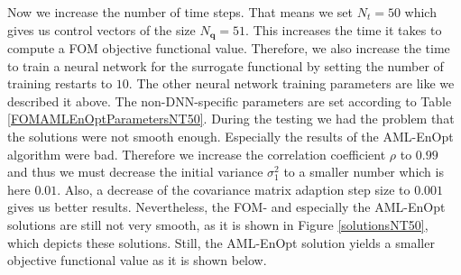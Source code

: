Now we increase the number of time steps. That means we set $N_t=50$ which gives us control vectors of the size $N_\mathbf{q}=51$. This increases the time it takes to compute a FOM objective functional value. Therefore, we also increase the time to train a neural network for the surrogate functional by setting the number of training restarts to $10$. The other neural network training parameters are like we described it above. The non-DNN-specific parameters are set according to Table \ref{FOMAMLEnOptParametersNT50}. During the testing we had the problem that the solutions were not smooth enough. Especially the results of the AML-EnOpt algorithm were bad. Therefore we increase the correlation coefficient $\rho$ to $0.99$ and thus we must decrease the initial variance $\sigma^2_1$ to a smaller number which is here $0.01$. Also, a decrease of the covariance matrix adaption step size to $0.001$ gives us better results. Nevertheless, the FOM- and especially the AML-EnOpt solutions are still not very smooth, as it is shown in Figure \ref{solutionsNT50}, which depicts these solutions. Still, the AML-EnOpt solution yields a smaller objective functional value as it is shown below.

